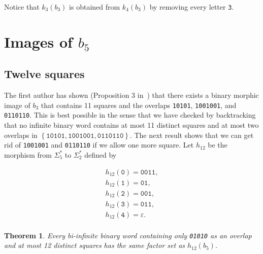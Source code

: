 \documentclass{article}
\def\acc#1{\left\{ #1 \right\}}
\theoremstyle{plain}
\newtheorem{theorem}{Theorem}
\theoremstyle{definition}
\theoremstyle{remark}
\begin{document}
Notice that $k_3(b_3)$ is obtained from $k_4(b_3)$ by removing every letter \texttt{3}.





\section{Images of $b_5$}\label{sec:b5}

\subsection{Twelve squares}\label{ssec:12sq}
The first author has shown (Proposition 3 in~\cite{Badkobeh-TCS}) that there exists a binary morphic image
of $b_3$ that contains 11 squares and the overlaps \texttt{10101}, \texttt{1001001}, and \texttt{0110110}.
This is best possible in the sense that we have checked by backtracking that no infinite binary word contains
at most 11 distinct squares and at most two overlaps in $\acc{\texttt{10101}, \texttt{1001001}, \texttt{0110110}}$.
The next result shows that we can get rid of \texttt{1001001} and \texttt{0110110} if we allow one more square.
Let $h_{12}$ be the morphism from $\Sigma_5^*$ to $\Sigma_2^*$ defined by

$$\begin{array}{l}
 h_{12}(\texttt{0})=\texttt{0011},\\
 h_{12}(\texttt{1})=\texttt{01},\\
 h_{12}(\texttt{2})=\texttt{001},\\
 h_{12}(\texttt{3})=\texttt{011},\\
 h_{12}(\texttt{4})=\varepsilon.\\
\end{array}$$

\begin{theorem}
Every bi-infinite binary word containing only \textnormal{\texttt{01010}} as an overlap
and at most 12 distinct squares has the same factor set as $h_{12}(b_5)$.
\end{theorem}
\end{document}
